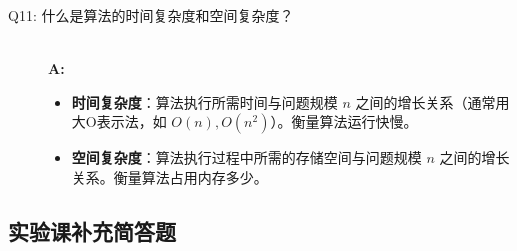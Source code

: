 \documentclass[a4paper,12pt]{article}
\begin{document}
\begin{description}
    \item[Q11: 什么是算法的时间复杂度和空间复杂度？] \hfill \\
    \textbf{A:} 
    \begin{itemize}
        \item \textbf{时间复杂度}：算法执行所需时间与问题规模 $n$ 之间的增长关系（通常用大O表示法，如 $O(n), O(n^2)$）。衡量算法运行快慢。
        \item \textbf{空间复杂度}：算法执行过程中所需的存储空间与问题规模 $n$ 之间的增长关系。衡量算法占用内存多少。
    \end{itemize}
\end{description}

\subsection{实验课补充简答题}
\end{document}
